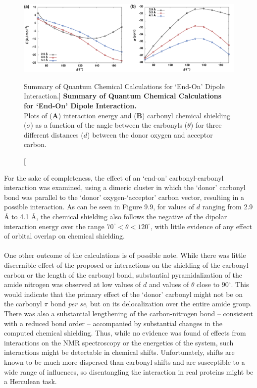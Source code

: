 \begin{figure}[h!]
\includegraphics[width=6.5in]{figs/npistar/09.png}
\caption
   [Summary of Quantum Chemical Calculations for `End-On' Dipole Interaction.]
  {{\bf
    Summary of Quantum Chemical Calculations for `End-On' Dipole Interaction.
  }
  \\
  Plots of ({\bf A}) interaction energy and ({\bf B}) carbonyl \cnmr{} chemical
  shielding ($\sigma$) as a function of the angle between the carbonyls
  ($\theta$) for three different distances ($d$) between the donor oxygen
  and acceptor carbon.
}
\end{figure}

\begin{doublespace}
For the sake of completeness, the effect of an `end-on' carbonyl-carbonyl
interaction was examined, using a dimeric cluster in which the `donor' carbonyl
bond was parallel to the `donor' oxygen-`acceptor' carbon vector, resulting in
a possible \nspistar{} interaction. As can be seen in Figure 9.9, for values of
$d$ ranging from 2.9 \r{A} to 4.1 \r{A}, the chemical shielding also follows
the negative of the dipolar interaction energy over the range
$70^\circ < \theta < 120^\circ$, with little evidence of any effect of orbital
overlap on chemical shielding.
\\\\
One other outcome of the calculations is of possible note. While there was
little discernible effect of the proposed \nspistar{} or \npipistar{}
interactions on the shielding of the carbonyl carbon or the length of the
carbonyl bond, substantial pyramidalization of the amide nitrogen was observed
at low values of $d$ and values of $\theta$ close to 90$^\circ$. This would
indicate that the primary effect of the `donor' carbonyl might not be on the
carbonyl $\pi$ bond \emph{per se}, but on its delocalization over the entire
amide group. There was also a substantial lengthening of the carbon-nitrogen
bond -- consistent with a reduced bond order -- accompanied by substantial
changes in the computed \nnmr{} chemical shielding. Thus, while no evidence
was found of effects from \nspistar{} interactions on the \cnmr{} NMR
spectroscopy or the energetics of the system, such interactions might be
detectable in \nnmr{} chemical shifts. Unfortunately, \nnmr{} shifts are known
to be much more dispersed than carbonyl \cnmr{} shifts and are susceptible to
a wide range of influences, so disentangling the interaction in real proteins
might be a Herculean task.
\end{doublespace}

